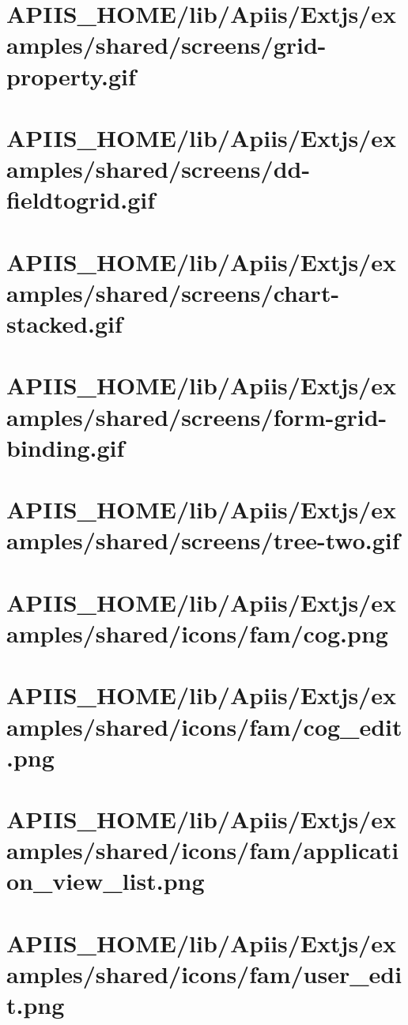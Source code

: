 \section{APIIS\_HOME/lib/Apiis/Extjs/examples/shared/screens/grid-property.gif} 
\section{APIIS\_HOME/lib/Apiis/Extjs/examples/shared/screens/dd-fieldtogrid.gif} 
\section{APIIS\_HOME/lib/Apiis/Extjs/examples/shared/screens/chart-stacked.gif} 
\section{APIIS\_HOME/lib/Apiis/Extjs/examples/shared/screens/form-grid-binding.gif} 
\section{APIIS\_HOME/lib/Apiis/Extjs/examples/shared/screens/tree-two.gif} 
\section{APIIS\_HOME/lib/Apiis/Extjs/examples/shared/icons/fam/cog.png} 
\section{APIIS\_HOME/lib/Apiis/Extjs/examples/shared/icons/fam/cog\_edit.png} 
\section{APIIS\_HOME/lib/Apiis/Extjs/examples/shared/icons/fam/application\_view\_list.png} 
\section{APIIS\_HOME/lib/Apiis/Extjs/examples/shared/icons/fam/user\_edit.png} 
